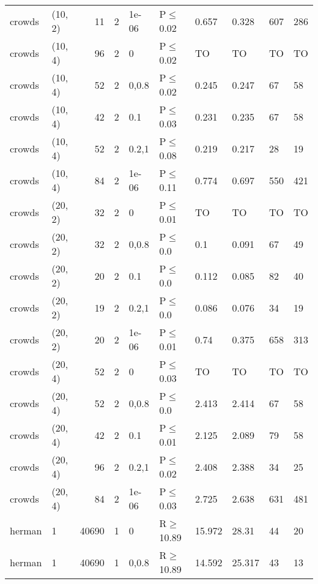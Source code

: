 \begin{longtable}{llrrllllll}
 crowds        & (10, 2)   &     	11 &   2 & 1e-06 & P$\leq$0.02  & 0.657   & 0.328   & 607     & 286  \\
 crowds        & (10, 4)   &     	96 &   2 & 0     & P$\leq$0.02  & TO      & TO      & TO      & TO   \\
 crowds        & (10, 4)   &     	52 &   2 & 0,0.8 & P$\leq$0.02  & 0.245   & 0.247   & 67      & 58   \\
 crowds        & (10, 4)   &     	42 &   2 & 0.1   & P$\leq$0.03  & 0.231   & 0.235   & 67      & 58   \\
 crowds        & (10, 4)   &     	52 &   2 & 0.2,1 & P$\leq$0.08  & 0.219   & 0.217   & 28      & 19   \\
 crowds        & (10, 4)   &     	84 &   2 & 1e-06 & P$\leq$0.11  & 0.774   & 0.697   & 550     & 421  \\
 crowds        & (20, 2)   &     	32 &   2 & 0     & P$\leq$0.01  & TO      & TO      & TO      & TO   \\
 crowds        & (20, 2)   &     	32 &   2 & 0,0.8 & P$\leq$0.0   & 0.1     & 0.091   & 67      & 49   \\
 crowds        & (20, 2)   &     	20 &   2 & 0.1   & P$\leq$0.0   & 0.112   & 0.085   & 82      & 40   \\
 crowds        & (20, 2)   &     	19 &   2 & 0.2,1 & P$\leq$0.0   & 0.086   & 0.076   & 34      & 19   \\
 crowds        & (20, 2)   &     	20 &   2 & 1e-06 & P$\leq$0.01  & 0.74    & 0.375   & 658     & 313  \\
 crowds        & (20, 4)   &     	52 &   2 & 0     & P$\leq$0.03  & TO      & TO      & TO      & TO   \\
 crowds        & (20, 4)   &     	52 &   2 & 0,0.8 & P$\leq$0.0   & 2.413   & 2.414   & 67      & 58   \\
 crowds        & (20, 4)   &     	42 &   2 & 0.1   & P$\leq$0.01  & 2.125   & 2.089   & 79      & 58   \\
 crowds        & (20, 4)   &     	96 &   2 & 0.2,1 & P$\leq$0.02  & 2.408   & 2.388   & 34      & 25   \\
 crowds        & (20, 4)   &     	84 &   2 & 1e-06 & P$\leq$0.03  & 2.725   & 2.638   & 631     & 481  \\
 herman        & 1         &  	40690 &   1 & 0     & R$\geq$10.89 & 15.972  & 28.31   & 44      & 20   \\
 herman        & 1         &  	40690 &   1 & 0,0.8 & R$\geq$10.89 & 14.592  & 25.317  & 43      & 13   \\

\end{longtable}
